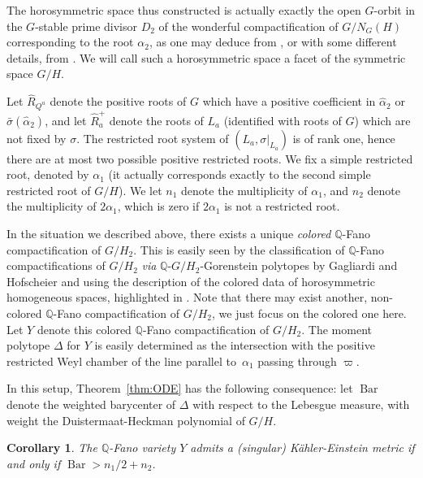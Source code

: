 \documentclass[10pt]{amsart}
\theoremstyle{plain}
\newtheorem{cor}[thm]{Corollary}
\theoremstyle{definition}
\DeclareMathOperator{\barDH}{Bar}
\newcommand{\ha}{\hat{\alpha}}
\newcommand{\Roots}{\hat{R}}
\begin{document}
The horosymmetric space thus constructed is actually exactly the open $G$-orbit
in the $G$-stable prime divisor $D_2$ of the wonderful compactification of $G/N_G(H)$
corresponding to the root $\alpha_2$, as one may deduce from \cite{DCP83}, or
with some different details, from \cite{DelHoro}.
We will call such a horosymmetric space a facet of the symmetric space $G/H$.

Let $\Roots_{Q^u}$ denote the positive roots of $G$ which have a positive coefficient
in $\ha_2$ or $\bar{\sigma}(\ha_2)$, and let $\Roots_{a}^+$ denote the roots
of $L_a$ (identified with roots of $G$) which are not fixed by $\sigma$.
The restricted root system of $(L_a,\sigma|_{L_a})$ is of rank one, hence
there are at most two possible positive restricted roots.
We fix a simple restricted root, denoted by $\alpha_1$ (it actually corresponds
exactly to the second simple restricted root of $G/H$). We let $n_1$ denote the
multiplicity of $\alpha_1$, and $n_2$ denote the multiplicity of $2\alpha_1$,
which is zero if $2\alpha_1$ is not a restricted root.

In the situation we described above, there exists a unique \emph{colored} $\mathbb{Q}$-Fano
compactification of $G/H_2$. This is easily seen by the classification of $\mathbb{Q}$-Fano
compactifications of $G/H_2$ \emph{via} $\mathbb{Q}$-$G/H_2$-Gorenstein polytopes
by Gagliardi and Hofscheier \cite{GH15_fano} and
using the description of the colored data of horosymmetric homogeneous spaces,
highlighted in \cite{DelHoro}.
Note that there may exist another, non-colored $\mathbb{Q}$-Fano compactification of $G/H_2$,
we just focus on the colored one here.
Let $Y$ denote this colored $\mathbb{Q}$-Fano compactification of $G/H_2$.
The moment polytope $\Delta$ for $Y$ is easily determined as
the intersection with the positive restricted Weyl chamber of
the line parallel to~$\alpha_1$ passing through $\varpi$.

In this setup, Theorem~\ref{thm:ODE} has the following consequence:
let $\barDH$ denote the weighted barycenter of $\Delta$ with respect to the
Lebesgue measure, with weight the Duistermaat-Heckman polynomial of $G/H$.

\begin{cor}
\label{cor:facets}
The $\mathbb{Q}$-Fano variety $Y$ admits a (singular) Kähler-Einstein metric
if and only if $\barDH>n_1/2+n_2$.
\end{cor}
\end{document}
